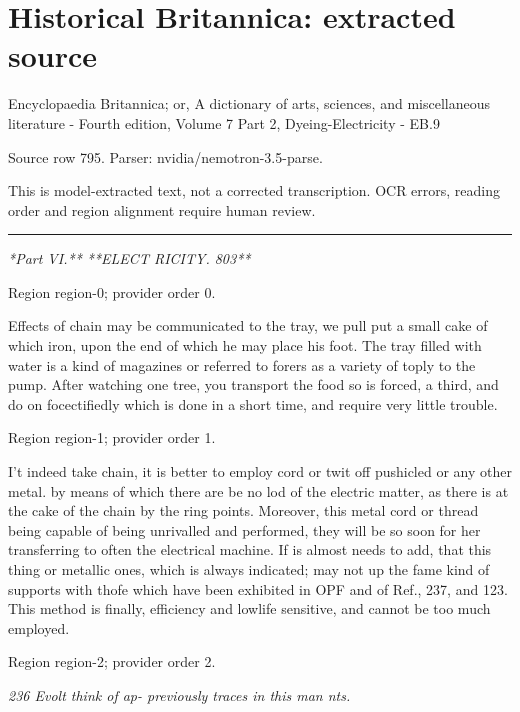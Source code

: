 \documentclass[11pt]{article}
\begin{document}
\section*{Historical Britannica: extracted source}
Encyclopaedia Britannica; or, A dictionary of arts, sciences, and miscellaneous literature - Fourth edition, Volume 7 Part 2, Dyeing-Electricity - EB.9\par
{\small Source row 795. Parser: nvidia/nemotron-3.5-parse.\par}
{\small This is model-extracted text, not a corrected transcription. OCR errors, reading order and region alignment require human review.\par}
\hrule\medskip
{\small\itshape **Part VI.** **ELECT RICITY. 803**\par}

{\scriptsize\color{gray} Region region-0; provider order 0.\par}
\medskip

Effects of chain may be communicated to the tray, we pull put a small cake of which iron, upon the end of which he may place his foot. The tray filled with water is a kind of magazines or referred to forers as a variety of toply to the pump. After watching one tree, you transport the food so is forced, a third, and do on focectifiedly which is done in a short time, and require very little trouble.
\par

{\scriptsize\color{gray} Region region-1; provider order 1.\par}
\medskip

I’t indeed take chain, it is better to employ cord or twit off pushicled or any other metal. by means of which there are be no lod of the electric matter, as there is at the cake of the chain by the ring points. Moreover, this metal cord or thread being capable of being unrivalled and performed, they will be so soon for her transferring to often the electrical machine. If is almost needs to add, that this thing or metallic ones, which is always indicated; may not up the fame kind of supports with thofe which have been exhibited in OPF and of Ref., 237, and 123. This method is finally, efficiency and lowlife sensitive, and cannot be too much employed.
\par

{\scriptsize\color{gray} Region region-2; provider order 2.\par}
\medskip

{\small\itshape 236 Evolt think of ap- previously traces in this man nts.\par}
\end{document}
